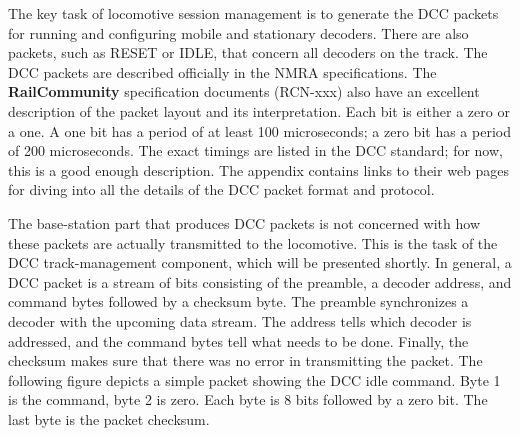 
The key task of locomotive session management is to generate the DCC packets for running and configuring mobile and stationary decoders. There are also packets, such as RESET or IDLE, that concern all decoders on the track. The DCC packets are described officially in the NMRA specifications. The \textbf{RailCommunity} specification documents (RCN-xxx) also have an excellent description of the packet layout and its interpretation. Each bit is either a zero or a one. A one bit has a period of at least 100 microseconds; a zero bit has a period of 200 microseconds. The exact timings are listed in the DCC standard; for now, this is a good enough description. The appendix contains links to their web pages for diving into all the details of the DCC packet format and protocol.

The base-station part that produces DCC packets is not concerned with how these packets are actually transmitted to the locomotive. This is the task of the DCC track-management component, which will be presented shortly. In general, a DCC packet is a stream of bits consisting of the preamble, a decoder address, and command bytes followed by a checksum byte. The preamble synchronizes a decoder with the upcoming data stream. The address tells which decoder is addressed, and the command bytes tell what needs to be done. Finally, the checksum makes sure that there was no error in transmitting the packet. The following figure depicts a simple packet showing the DCC idle command. Byte 1 is the command, byte 2 is zero. Each byte is 8 bits followed by a zero bit. The last byte is the packet checksum.

